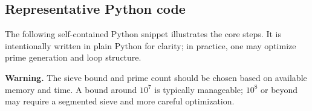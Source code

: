 \documentclass[11pt]{article}
\theoremstyle{definition}
\theoremstyle{plain}
\theoremstyle{remark}
\newcommand{\1}{\mathbb{1}}
\begin{document}
\subsection{Representative Python code}

The following self-contained Python snippet illustrates the core steps. It is intentionally written in plain Python for clarity; in practice, one may optimize prime generation and loop structure.

\medskip

\noindent\textbf{Warning.} The sieve bound and prime count should be chosen based on available memory and time. A bound around \(10^7\) is typically manageable; \(10^8\) or beyond may require a segmented sieve and more careful optimization.
\end{document}
